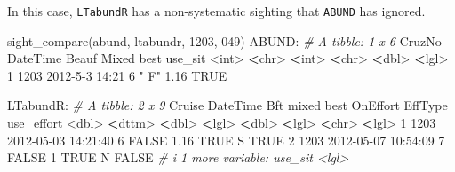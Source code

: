 \documentclass[
]{book}
\newenvironment{Shaded}{\begin{snugshade}}{\end{snugshade}}
\newcommand{\CommentTok}[1]{\textcolor[rgb]{0.56,0.35,0.01}{\textit{#1}}}
\newcommand{\ConstantTok}[1]{\textcolor[rgb]{0.00,0.00,0.00}{#1}}
\newcommand{\DecValTok}[1]{\textcolor[rgb]{0.00,0.00,0.81}{#1}}
\newcommand{\ErrorTok}[1]{\textcolor[rgb]{0.64,0.00,0.00}{\textbf{#1}}}
\newcommand{\FloatTok}[1]{\textcolor[rgb]{0.00,0.00,0.81}{#1}}
\newcommand{\FunctionTok}[1]{\textcolor[rgb]{0.00,0.00,0.00}{#1}}
\newcommand{\NormalTok}[1]{#1}
\newcommand{\SpecialCharTok}[1]{\textcolor[rgb]{0.00,0.00,0.00}{#1}}
\newcommand{\StringTok}[1]{\textcolor[rgb]{0.31,0.60,0.02}{#1}}
\begin{document}
In this case, \texttt{LTabundR} has a non-systematic sighting that \texttt{ABUND} has ignored.

\begin{Shaded}
\begin{Highlighting}[]
\FunctionTok{sight\_compare}\NormalTok{(abund, ltabundr, }\DecValTok{1203}\NormalTok{, }\StringTok{\textquotesingle{}049\textquotesingle{}}\NormalTok{)}
\NormalTok{ABUND}\SpecialCharTok{:}
\CommentTok{\# A tibble: 1 x 6}
\NormalTok{  CruzNo DateTime       Beauf Mixed  best use\_sit}
   \SpecialCharTok{\textless{}}\NormalTok{int}\SpecialCharTok{\textgreater{}} \ErrorTok{\textless{}}\NormalTok{chr}\SpecialCharTok{\textgreater{}}          \ErrorTok{\textless{}}\NormalTok{int}\SpecialCharTok{\textgreater{}} \ErrorTok{\textless{}}\NormalTok{chr}\SpecialCharTok{\textgreater{}} \ErrorTok{\textless{}}\NormalTok{dbl}\SpecialCharTok{\textgreater{}} \ErrorTok{\textless{}}\NormalTok{lgl}\SpecialCharTok{\textgreater{}}  
\DecValTok{1}   \DecValTok{1203} \DecValTok{2012{-}5{-}3} \DecValTok{14}\SpecialCharTok{:}\DecValTok{21}     \DecValTok{6} \StringTok{" F"}   \FloatTok{1.16} \ConstantTok{TRUE}   

\NormalTok{LTabundR}\SpecialCharTok{:}
\CommentTok{\# A tibble: 2 x 9}
\NormalTok{  Cruise DateTime              Bft mixed  best OnEffort EffType use\_effort}
   \SpecialCharTok{\textless{}}\NormalTok{dbl}\SpecialCharTok{\textgreater{}} \ErrorTok{\textless{}}\NormalTok{dttm}\SpecialCharTok{\textgreater{}}              \ErrorTok{\textless{}}\NormalTok{dbl}\SpecialCharTok{\textgreater{}} \ErrorTok{\textless{}}\NormalTok{lgl}\SpecialCharTok{\textgreater{}} \ErrorTok{\textless{}}\NormalTok{dbl}\SpecialCharTok{\textgreater{}} \ErrorTok{\textless{}}\NormalTok{lgl}\SpecialCharTok{\textgreater{}}    \ErrorTok{\textless{}}\NormalTok{chr}\SpecialCharTok{\textgreater{}}   \ErrorTok{\textless{}}\NormalTok{lgl}\SpecialCharTok{\textgreater{}}     
\DecValTok{1}   \DecValTok{1203} \DecValTok{2012{-}05{-}03} \DecValTok{14}\SpecialCharTok{:}\DecValTok{21}\SpecialCharTok{:}\DecValTok{40}     \DecValTok{6} \ConstantTok{FALSE}  \FloatTok{1.16} \ConstantTok{TRUE}\NormalTok{     S       }\ConstantTok{TRUE}      
\DecValTok{2}   \DecValTok{1203} \DecValTok{2012{-}05{-}07} \DecValTok{10}\SpecialCharTok{:}\DecValTok{54}\SpecialCharTok{:}\DecValTok{09}     \DecValTok{7} \ConstantTok{FALSE}  \DecValTok{1}    \ConstantTok{TRUE}\NormalTok{     N       }\ConstantTok{FALSE}     
\CommentTok{\# i 1 more variable: use\_sit \textless{}lgl\textgreater{}}
\end{Highlighting}
\end{Shaded}
\end{document}
